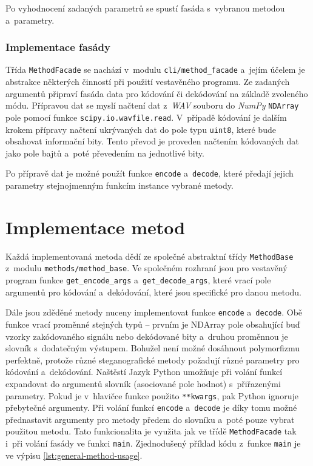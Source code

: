 \noindent Po vyhodnocení zadaných parametrů se spustí fasáda s~vybranou metodou
a~parametry.

\subsubsection*{Implementace fasády}
\label{ssub:facade-implementation}

Třída \texttt{MethodFacade} se nachází v~modulu \texttt{cli/method\_facade}
a~jejím účelem je abstrakce některých činností při použití vestavěného
programu. Ze zadaných argumentů připraví fasáda data pro kódování či dekódování
na základě zvoleného módu. Přípravou dat se myslí načtení dat z~\textit{WAV}
souboru do \textit{NumPy} \texttt{NDArray} pole pomocí funkce
\texttt{scipy.io.wavfile.read}. V~případě kódování je dalším krokem přípravy
načtení ukrývaných dat do pole typu \texttt{uint8}, které bude obsahovat
informační bity. Tento převod je proveden načtením kódovaných dat jako pole
bajtů a~poté převedením na jednotlivé bity.

Po přípravě dat je možné použít funkce \texttt{encode} a~\texttt{decode}, které
předají jejich parametry stejnojmenným funkcím instance vybrané metody.

\section{Implementace metod}
\label{sec:method-implementation}

Každá implementovaná metoda dědí ze společné abstraktní třídy
\texttt{MethodBase} z~modulu \texttt{methods/method\_base}. Ve společném
rozhraní jsou pro vestavěný program funkce \texttt{get\_encode\_args}
a~\texttt{get\_decode\_args}, které vrací pole argumentů pro kódování
a~dekódování, které jsou specifické pro danou metodu.

Dále jsou zděděné metody nuceny implementovat funkce \texttt{encode}
a~\texttt{decode}. Obě funkce vrací proměnné stejných typů -- prvním je NDArray
pole obsahující buď vzorky zakódovaného signálu nebo dekódované bity a~druhou
proměnnou je slovník s~dodatečným výstupem. Bohužel není možné dosáhnout
polymorfizmu perfektně, protože různé steganografické metody požadují různé
parametry pro kódování a~dekódování. Naštěstí Jazyk Python umožňuje při volání
funkcí expandovat do argumentů slovník (asociované pole hodnot) s~přiřazenými
parametry. Pokud je v~hlavičce funkce použito \texttt{**kwargs}, pak Python
ignoruje přebytečné argumenty. Při volání funkcí \texttt{encode}
a~\texttt{decode} je díky tomu možné přednastavit argumenty pro metody předem
do slovníku a~poté pouze vybrat použitou metodu. Tato funkcionalita je využita
jak ve třídě \texttt{MethodFacade} tak i~při volání fasády ve funkci
\texttt{main}. Zjednodušený příklad kódu z~funkce \texttt{main} je ve výpisu
\ref{lst:general-method-usage}.

